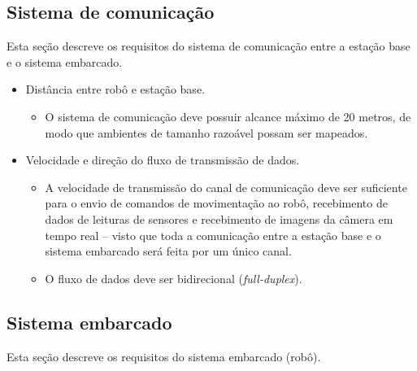\subsection{Sistema de comunicação}
Esta seção descreve os requisitos do sistema de comunicação entre a estação base e o sistema embarcado.

\begin{itemize} %

  \item Distância entre robô e estação base.
    \begin{itemize}
      \item O sistema de comunicação deve possuir alcance máximo de 20 metros, de modo que ambientes de tamanho razoável possam ser mapeados.
    \end{itemize}

  \item Velocidade e direção do fluxo de transmissão de dados.
    \begin{itemize}
      \item A velocidade de transmissão do canal de comunicação deve ser suficiente para o envio de comandos de movimentação ao robô, recebimento de dados de leituras de sensores e recebimento de imagens da câmera em tempo real -- visto que toda a comunicação entre a estação base e o sistema embarcado será feita por um único canal.
      \item O fluxo de dados deve ser bidirecional (\textit{full-duplex}).
    \end{itemize}

\end{itemize} %



\subsection{Sistema embarcado}
Esta seção descreve os requisitos do sistema embarcado (robô).

